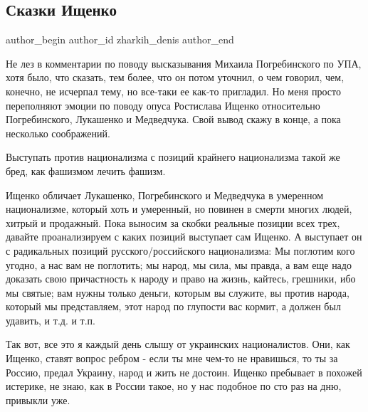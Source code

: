  
 
 
 
 
 
\subsection{Сказки Ищенко}
\label{sec:07_12_2020.fb.zharkih_denis.1.skazki_ischenko}
\ifcmt
	author_begin
   author_id zharkih_denis
	author_end
\fi


Не лез в комментарии по поводу высказывания Михаила Погребинского по УПА, хотя
было, что сказать, тем более, что он потом уточнил, о чем говорил, чем,
конечно, не исчерпал тему, но все-таки ее как-то пригладил. Но меня просто
переполняют эмоции по поводу опуса Ростислава Ищенко относительно
Погребинского, Лукашенко и Медведчука. Свой вывод скажу в конце, а пока
несколько соображений. 

Выступать против национализма с позиций крайнего национализма такой же бред,
как фашизмом лечить фашизм.

Ищенко обличает Лукашенко, Погребинского и Медведчука в умеренном национализме,
который хоть и умеренный, но повинен в смерти многих людей, хитрый и продажный.
Пока выносим за скобки реальные позиции всех трех, давайте проанализируем с
каких позиций выступает сам Ищенко. А выступает он с радикальных позиций
русского/российского национализма: Мы поглотим кого угодно, а нас вам не
поглотить;  мы народ, мы сила, мы правда, а вам еще надо доказать свою
причастность к народу и право на жизнь, кайтесь, грешники, ибо мы святые; вам
нужны только деньги, которым вы служите, вы против народа, который мы
представляем, этот народ по глупости вас кормит, а должен был удавить, и т.д. и
т.п. 

Так вот, все это я каждый день слышу от украинских националистов. Они, как
Ищенко, ставят вопрос ребром - если ты мне чем-то не нравишься, то ты за
Россию, предал Украину, народ и жить не достоин. Ищенко пребывает в похожей
истерике, не знаю, как в России такое, но у нас подобное по сто раз на дню,
привыкли уже. 

